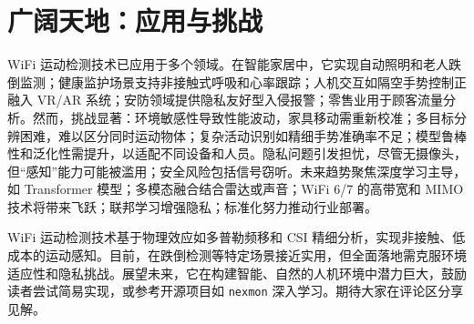 \chapter{广阔天地：应用与挑战}
WiFi 运动检测技术已应用于多个领域。在智能家居中，它实现自动照明和老人跌倒监测；健康监护场景支持非接触式呼吸和心率跟踪；人机交互如隔空手势控制正融入 VR/AR 系统；安防领域提供隐私友好型入侵报警；零售业用于顾客流量分析。然而，挑战显著：环境敏感性导致性能波动，家具移动需重新校准；多目标分辨困难，难以区分同时运动物体；复杂活动识别如精细手势准确率不足；模型鲁棒性和泛化性需提升，以适配不同设备和人员。隐私问题引发担忧，尽管无摄像头，但“感知”能力可能被滥用；安全风险包括信号窃听。未来趋势聚焦深度学习主导，如 Transformer 模型；多模态融合结合雷达或声音；WiFi 6/7 的高带宽和 MIMO 技术将带来飞跃；联邦学习增强隐私；标准化努力推动行业部署。\par
WiFi 运动检测技术基于物理效应如多普勒频移和 CSI 精细分析，实现非接触、低成本的运动感知。目前，在跌倒检测等特定场景接近实用，但全面落地需克服环境适应性和隐私挑战。展望未来，它在构建智能、自然的人机环境中潜力巨大，鼓励读者尝试简易实现，或参考开源项目如 \texttt{nexmon} 深入学习。期待大家在评论区分享见解。\par
